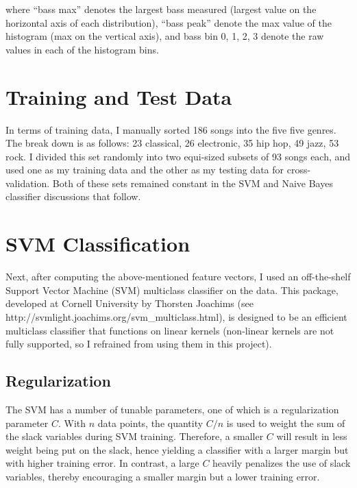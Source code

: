 \documentclass[aps,twocolumn,secnumarabic,balancelastpage,amsmath,amssymb,nofootinbib]{revtex4-1}
\begin{document}
where ``bass max'' denotes the largest bass measured (largest value on the horizontal axis of each distribution), ``bass peak'' denote the max value of the histogram (max on the vertical axis), and bass bin 0, 1, 2, 3 denote the raw values in each of the histogram bins.


\section{Training and Test Data}
In terms of training data, I manually sorted 186 songs into the five five genres. The break down is as follows: 23 classical, 26 electronic, 35 hip hop, 49 jazz, 53 rock. I divided this set randomly into two equi-sized subsets of 93 songs each, and used one as my training data and the other as my testing data for cross-validation. Both of these sets remained constant in the SVM and Naive Bayes classifier discussions that follow.

\section{SVM Classification}
Next, after computing the above-mentioned feature vectors, I used an off-the-shelf Support Vector Machine (SVM) multiclass classifier on the data. This package, developed at Cornell University by Thorsten Joachims (see \textrm{http://svmlight.joachims.org/svm\_multiclass.html}), is designed to be an efficient multiclass classifier that functions on linear kernels (non-linear kernels are not fully supported, so I refrained from using them in this project).

\subsection*{Regularization}
The SVM has a number of tunable parameters, one of which is a regularization parameter $C$. With $n$ data points, the quantity $C/n$ is used to weight the sum of the slack variables during SVM training. Therefore, a smaller $C$ will result in less weight being put on the slack, hence yielding a classifier with a larger margin but with higher training error. In contrast, a large $C$ heavily penalizes the use of slack variables, thereby encouraging a smaller margin but a lower training error.
\end{document}
